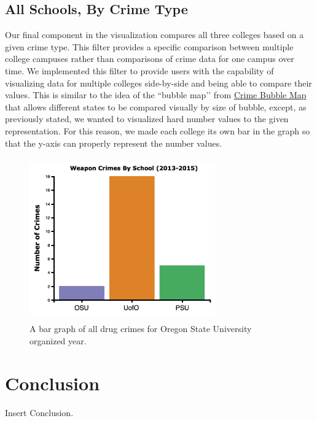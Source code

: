 \documentclass[journal]{vgtc}                %
\begin{document}
\subsection{All Schools, By Crime Type}
Our final component in the visualization compares all three colleges based on a given crime type. This filter provides a specific comparison between multiple college campuses rather than comparisons of crime data for one campus over time. We implemented this filter to provide users with the capability of visualizing data for multiple colleges side-by-side and being able to compare their values. This is similar to the idea of the ``bubble map’’ from \href{http://funcvis.org/visuals/crime/#all_states=&crimes=}{Crime Bubble Map} that allows different states to be compared visually by size of bubble, except, as previously stated, we wanted to visualized hard number values to the given representation. For this reason, we made each college its own bar in the graph so that the y-axis can properly represent the number values.
\begin{figure}[H]
\label{fig:AllSchoolsOneType}
\centering
\includegraphics[width=8cm, height=7cm]{AllSchoolsOneType}
\caption{A bar graph of all drug crimes for Oregon State University organized year.}
\end{figure}

\section{Conclusion}

Insert Conclusion.



%

%
%
%


\end{document}
